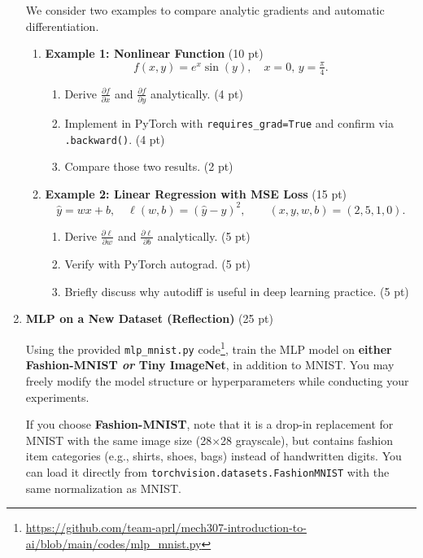 \documentclass[12pt]{article}
\begin{document}
\begin{enumerate}[label=\textbf{Q\arabic*.}]
We consider two examples to compare analytic gradients and automatic differentiation.

\begin{enumerate}[label=(\alph*)]
    \item \textbf{Example 1: Nonlinear Function} (10 pt)  
    \[
        f(x, y) = e^x \sin(y), \quad x=0, \, y=\tfrac{\pi}{4}.
    \]
    \begin{enumerate}[label=(\roman*)]
        \item Derive $\frac{\partial f}{\partial x}$ and $\frac{\partial f}{\partial y}$ analytically. (4 pt)
        \item Implement in PyTorch with \verb|requires_grad=True| and confirm via \verb|.backward()|. (4 pt)
        \item Compare those two results. (2 pt)
    \end{enumerate}

    \item \textbf{Example 2: Linear Regression with MSE Loss} (15 pt)  
    \[
        \hat{y} = w x + b, 
        \quad 
        \ell(w,b) = (\hat{y} - y)^2,
        \qquad (x,y,w,b)=(2,5,1,0).
    \]
    \begin{enumerate}[label=(\roman*)]
        \item Derive $\frac{\partial \ell}{\partial w}$ and $\frac{\partial \ell}{\partial b}$ analytically. (5 pt)
        \item Verify with PyTorch autograd. (5 pt)
        \item Briefly discuss why autodiff is useful in deep learning practice. (5 pt)
    \end{enumerate}
\end{enumerate}

\item \textbf{MLP on a New Dataset (Reflection)} (25 pt)

Using the provided \texttt{mlp\_mnist.py} code\footnote{\url{https://github.com/team-aprl/mech307-introduction-to-ai/blob/main/codes/mlp_mnist.py}}, train the MLP model on \textbf{either Fashion-MNIST \emph{or} Tiny ImageNet}, in addition to MNIST.  
You may freely modify the model structure or hyperparameters while conducting your experiments.

If you choose \textbf{Fashion-MNIST}, note that it is a drop-in replacement for MNIST with the same image size (28$\times$28 grayscale), 
but contains fashion item categories (e.g., shirts, shoes, bags) instead of handwritten digits.  
You can load it directly from \texttt{torchvision.datasets.FashionMNIST} with the same normalization as MNIST.  


\end{enumerate}
\end{document}
